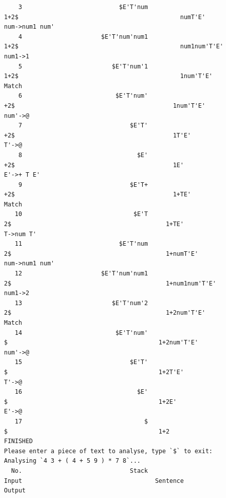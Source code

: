 \documentclass[UTF8]{ctexart}
\begin{document}
\begin{lstlisting}
    3                           $E'T'num                                         1+2$                                             numT'E'                      num->num1 num'
    4                      $E'T'num'num1                                         1+2$                                             num1num'T'E'                     num1->1
    5                         $E'T'num'1                                         1+2$                                             1num'T'E'                    Match
    6                          $E'T'num'                                          +2$                                            1num'T'E'                     num'->@
    7                              $E'T'                                          +2$                                            1T'E'                       T'->@
    8                                $E'                                          +2$                                            1E'                       E'->+ T E'
    9                              $E'T+                                          +2$                                            1+TE'                    Match
   10                               $E'T                                           2$                                           1+TE'                        T->num T'
   11                           $E'T'num                                           2$                                           1+numT'E'                      num->num1 num'
   12                      $E'T'num'num1                                           2$                                           1+num1num'T'E'                     num1->2
   13                         $E'T'num'2                                           2$                                           1+2num'T'E'                    Match
   14                          $E'T'num'                                            $                                          1+2num'T'E'                     num'->@
   15                              $E'T'                                            $                                          1+2T'E'                       T'->@
   16                                $E'                                            $                                          1+2E'                       E'->@
   17                                  $                                            $                                          1+2                 FINISHED
Please enter a piece of text to analyse, type `$` to exit:
Analysing `4 3 + ( 4 + 5 9 ) * 7 8`...
  No.                              Stack                                        Input                                     Sentence                   Output

\end{lstlisting}
\end{document}
